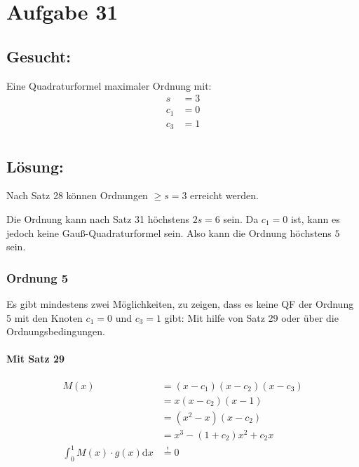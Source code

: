\section*{Aufgabe 31}
\subsection*{Gesucht:}
Eine Quadraturformel maximaler Ordnung mit:
\begin{align}
    s   &= 3\\
    c_1 &= 0\\
    c_3 &= 1\\
\end{align}

\subsection*{Lösung:}

Nach Satz 28 können Ordnungen $\geq s = 3$ erreicht werden.

Die Ordnung kann nach Satz 31 höchstens $2s = 6$ sein. Da $c_1 = 0$
ist, kann es jedoch keine Gauß-Quadraturformel sein. Also kann
die Ordnung höchstens $5$ sein.

\subsubsection*{Ordnung 5}

Es gibt mindestens zwei Möglichkeiten, zu zeigen, dass es keine
QF der Ordnung 5 mit den Knoten $c_1 = 0$ und $c_3 = 1$ gibt:
Mit hilfe von Satz 29 oder über die Ordnungsbedingungen.

\paragraph*{Mit Satz 29}

\begin{align}
    M(x) &= (x-c_1) (x-c_2) (x-c_3)\\
      &= x (x-c_2) (x-1)\\
      &= (x^2- x) (x-c_2)\\
      &= x^3 - (1+c_2)x^2 + c_2 x\\
    \int_0^1 M(x) \cdot g(x) \mathrm{d} x &\stackrel{!}{=} 0
\end{align}


